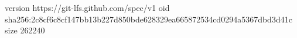 version https://git-lfs.github.com/spec/v1
oid sha256:2c8cf6c8cf147bb13b227d850bde628329ea665872534cd0294a5367dbd3d41c
size 262240
